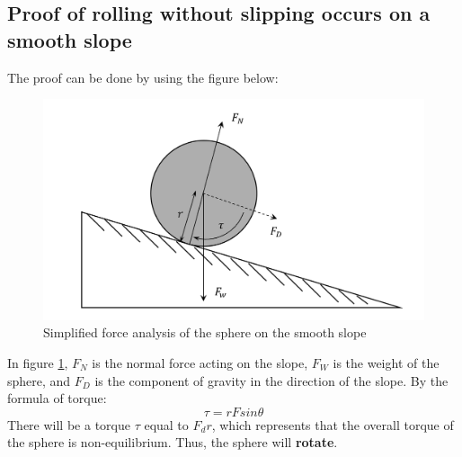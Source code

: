 \documentclass{article}
\begin{document}
    \subsection{Proof of rolling without slipping occurs on a smooth slope} \label{proofofslide}
        The proof can be done by using the figure below:
        \begin{figure}[H]
            \centering
            \includegraphics[width=0.5\linewidth]{no_friction.png}
            \caption{Simplified force analysis of the sphere on the smooth slope}
            \label{frictionless}
        \end{figure}
        In figure \ref{frictionless}, $F_N$ is the normal force acting on the slope, $F_W$ is the weight of the sphere, and $F_D$ is the component of gravity in the direction of the slope.
        By the formula of torque:
        \begin{equation}
            \tau = rFsin\theta
        \end{equation}
        There will be a torque $\tau$ equal to $F_dr$, which represents that the overall torque of the sphere is non-equilibrium. Thus, the sphere will \textbf{rotate}.
\end{document}

